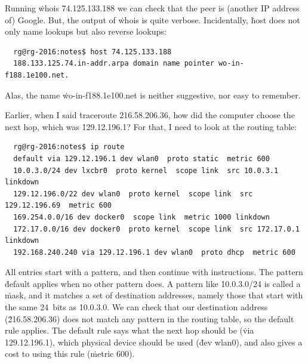 Running \.{whois 74.125.133.188} we can check that the peer
  is (another IP address of) Google.
But, the output of \.{whois} is quite verbose.
Incidentally, \.{host} does not only name lookups but also reverse lookups:
{\footnotesize
\begin{verbatim}
  rg@rg-2016:notes$ host 74.125.133.188
  188.133.125.74.in-addr.arpa domain name pointer wo-in-f188.1e100.net.
\end{verbatim}
}\noindent
Alas, the name \.{wo-in-f188.1e100.net} is neither suggestive,
  nor easy to remember.

Earlier, when I said \.{traceroute 216.58.206.36},
  how did the computer choose the next hop,
    which was \.{129.12.196.1}?
For that, I need to look at the routing table:
{\footnotesize
\begin{verbatim}
  rg@rg-2016:notes$ ip route
  default via 129.12.196.1 dev wlan0  proto static  metric 600 
  10.0.3.0/24 dev lxcbr0  proto kernel  scope link  src 10.0.3.1 linkdown 
  129.12.196.0/22 dev wlan0  proto kernel  scope link  src 129.12.196.69  metric 600 
  169.254.0.0/16 dev docker0  scope link  metric 1000 linkdown 
  172.17.0.0/16 dev docker0  proto kernel  scope link  src 172.17.0.1 linkdown 
  192.168.240.240 via 129.12.196.1 dev wlan0  proto dhcp  metric 600
\end{verbatim}
}%
All entries start with a pattern, and then continue with instructions.
The pattern \.{default} applies when no other pattern does.
A pattern like \.{10.0.3.0/24} is called a \.{mask},
  and it matches a set of destination addresses,
  namely those that start with the same 24~bits as \.{10.0.3.0}.
We can check that our destination address (\.{216.58.206.36})
  does not match any pattern in the routing table,
  so the default rule applies.
The default rule says
  what the next hop should be (\.{via 129.12.196.1}),
  which physical device should be used (\.{dev wlan0}),
  and also gives a cost to using this rule (\.{metric 600}).

